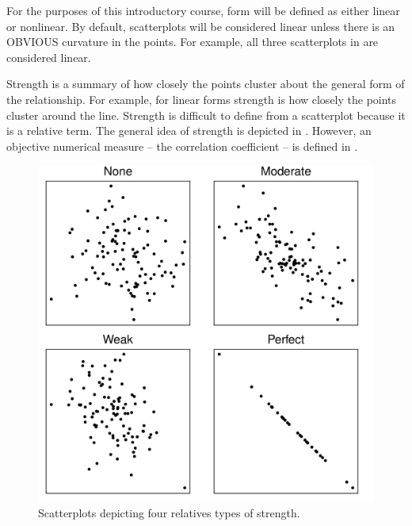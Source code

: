 \documentclass[10pt,openany]{book}\usepackage[]{graphicx}\usepackage[]{color}
\newenvironment{knitrout}{}{} %
\begin{document}

\vspace{-12pt}

\vspace{-12pt}

For the purposes of this introductory course, form will be defined as either linear or nonlinear. By default, scatterplots will be considered linear unless there is an OBVIOUS curvature in the points.  For example, all three scatterplots in  are considered linear.

Strength is a summary of how closely the points cluster about the general form of the relationship.  For example, for linear forms strength is how closely the points cluster around the line.  Strength is difficult to define from a scatterplot because it is a relative term.  The general idea of strength is depicted in .  However, an objective numerical measure -- the correlation coefficient -- is defined in .

\begin{knitrout}
\color{fgcolor}\begin{figure}[hbtp]

{\centering \includegraphics[width=.8\linewidth]{Figs/corrstrength1-1} 

}

\caption[Scatterplots depicting four relatives types of strength]{Scatterplots depicting four relatives types of strength.}\label{fig:corrstrength1}
\end{figure}


\end{knitrout}
\end{document}
